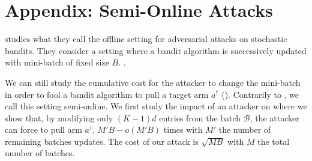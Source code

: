 \section{Appendix: Semi-Online Attacks}

\cite{liu2019data} studies what they call the offline setting for adversarial attacks on stochastic bandits. They consider a setting where a bandit algorithm is successively updated with mini-batch of fixed size $B$. 
. 

We can still study the cumulative cost for the attacker to change the mini-batch in order to fool a bandit algorithm to pull a target arm $a^{\dagger}$ (). Contrarily to \cite{liu2019data}, we call this setting semi-online. We first study the impact of an attacker on \linucb where we show that, by modifying only $(K-1)d$ entries from the batch $\mathcal{B}$, the attacker can force \linucb to pull arm $a^{\dagger}$, $M'B - o(M'B)$ times with $M'$ the number of remaining batches updates. The cost of our attack is $\sqrt{MB}$ with $M$ the total number of batches.

